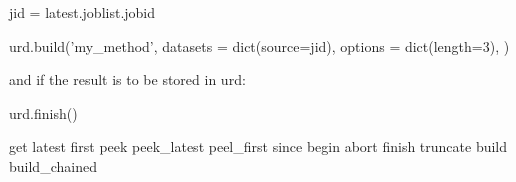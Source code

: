\begin{python}
  jid = latest.joblist.jobid

  urd.build('my_method',
    datasets = dict(source=jid),
    options = dict(length=3),
  )
\end{python}
and if the result is to be stored in urd:

\begin{python}
  urd.finish()
\end{python}


get
latest
first
peek
peek\_latest
peel\_first
since
begin
abort
finish
truncate
build
build\_chained


